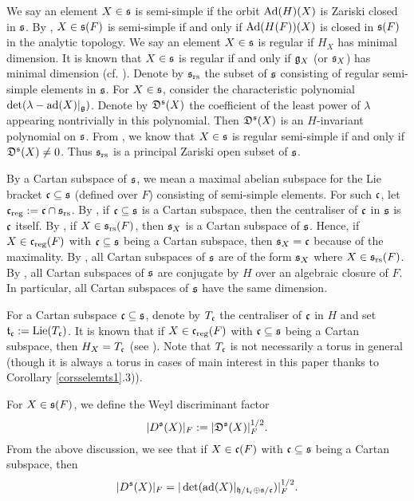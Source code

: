 \documentclass[a4paper]{amsart}
\newcommand{\alg}{{\mathrm{alg}}}                    \newcommand{\Alb}{{\mathrm{Alb}}}            \newcommand{\an}{{\mathrm{an}}}
\newcommand{\Lie}{{\mathrm{Lie}}}                    \newcommand{\LL}[1]{L^\alg(E^{(#1)}, 1)}       \newcommand{\Mp}{{\mathrm{Mp}}}
\theoremstyle{definition}
\theoremstyle{remark}
\numberwithin{equation}{subsection}
\begin{document}
We say an element $X\in{\mathfrak{s}}$ is semi-simple if the orbit ${\mathrm{Ad}}(H)(X)$ is Zariski closed in ${\mathfrak{s}}$. 
By \cite[Fact A, p. 108-109]{MR1375304}, $X\in{\mathfrak{s}}(F)$ is semi-simple if and only if ${\mathrm{Ad}}(H(F))(X)$ is closed in ${\mathfrak{s}}(F)$ in the analytic topology. We say an element $X\in{\mathfrak{s}}$ is regular if $H_X$ has minimal dimension. It is known that $X\in{\mathfrak{s}}$ is regular if and only if ${\mathfrak{g}}_X$ (or ${\mathfrak{s}}_X$) has minimal dimension (cf. \cite[Proposition 7]{MR311837}). Denote by ${\mathfrak{s}}_{\mathrm{rs}}$ the subset of ${\mathfrak{s}}$ consisting of regular semi-simple elements in ${\mathfrak{s}}$. 
For $X\in{\mathfrak{s}}$, consider the characteristic polynomial $\det(\lambda-{\mathrm{ad}}(X)|_{\mathfrak{g}})$. Denote by ${\mathfrak{D}}^{\mathfrak{s}}(X)$ the coefficient of the least power of $\lambda$ appearing nontrivially in this polynomial. Then ${\mathfrak{D}}^{\mathfrak{s}}(X)$ is an $H$-invariant polynomial on ${\mathfrak{s}}$. From \cite[end of p. 107]{MR1375304}, we know that $X\in{\mathfrak{s}}$ is regular semi-simple if and only if ${\mathfrak{D}}^{\mathfrak{s}}(X)\neq 0$. Thus ${\mathfrak{s}}_{\mathrm{rs}}$ is a principal Zariski open subset of ${\mathfrak{s}}$. 

By a Cartan subspace of ${\mathfrak{s}}$, we mean a maximal abelian subspace for the Lie bracket ${\mathfrak{c}}\subseteq{\mathfrak{s}}$ (defined over $F$) consisting of semi-simple elements. For such ${\mathfrak{c}}$, let ${\mathfrak{c}}_{\mathrm{reg}}:={\mathfrak{c}}\cap{\mathfrak{s}}_{\mathrm{rs}}$. By \cite[Theorem 5.1 and Corollary of Theorem 5.2]{MR404361}, if ${\mathfrak{c}}\subseteq{\mathfrak{s}}$ is a Cartan subspace, then the centraliser of ${\mathfrak{c}}$ in ${\mathfrak{s}}$ is ${\mathfrak{c}}$ itself. By \cite[Corollary 2 of Theorem 3.2]{MR404361}, if $X\in{\mathfrak{s}}_{\mathrm{rs}}(F)$, then ${\mathfrak{s}}_X$ is a Cartan subspace of ${\mathfrak{s}}$. Hence, if $X\in{\mathfrak{c}}_{\mathrm{reg}}(F)$ with ${\mathfrak{c}}\subseteq{\mathfrak{s}}$ being a Cartan subspace, then ${\mathfrak{s}}_X={\mathfrak{c}}$ because of the maximality. By \cite[Corollary 2 of Theorem 4.1]{MR404361}, all Cartan subspaces of ${\mathfrak{s}}$ are of the form ${\mathfrak{s}}_X$ where $X\in{\mathfrak{s}}_{\mathrm{rs}}(F)$. By \cite[p. 323]{MR366941}, all Cartan subspaces of ${\mathfrak{s}}$ are conjugate by $H$ over an algebraic closure of $F$. In particular, all Cartan subspaces of ${\mathfrak{s}}$ have the same dimension. 

For a Cartan subspace ${\mathfrak{c}}\subseteq{\mathfrak{s}}$, denote by $T_{\mathfrak{c}}$ the centraliser of ${\mathfrak{c}}$ in $H$ and set $\ft_\fc:=\Lie(T_\fc)$. It is known that if $X\in{\mathfrak{c}}_{\mathrm{reg}}(F)$ with ${\mathfrak{c}}\subseteq{\mathfrak{s}}$ being a Cartan subspace, then $H_X=T_{\mathfrak{c}}$ (see \cite[p. 112]{MR1375304}). Note that $T_{\mathfrak{c}}$ is not necessarily a torus in general (though it is always a torus in cases of main interest in this paper thanks to Corollary \ref{corsselemts1}.3)). 

For $X\in{\mathfrak{s}}(F)$, we define the Weyl discriminant factor 
$$ |D^{\mathfrak{s}}(X)|_F:=|{\mathfrak{D}}^{\mathfrak{s}}(X)|_F^{1/2}. $$
From the above discussion, we see that if $X\in{\mathfrak{c}}(F)$ with ${\mathfrak{c}}\subseteq{\mathfrak{s}}$ being a Cartan subspace, then 
\begin{equation}\label{weyldisc}
 |D^{\mathfrak{s}}(X)|_F=|\det({\mathrm{ad}}(X)|_{{\mathfrak{h}}/{\mathfrak{t}}_{\mathfrak{c}}\oplus{\mathfrak{s}}/{\mathfrak{c}}})|_F^{1/2}.  
 \end{equation}
\end{document}
